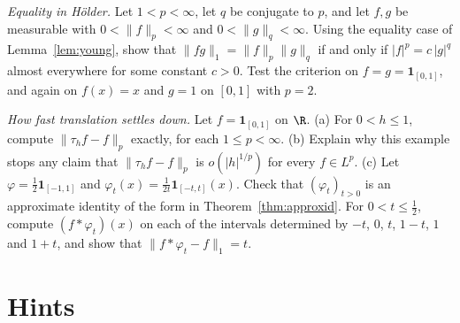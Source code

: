 \begin{exercise}[$\star\star$]\label{ex:v7c10c}
\emph{Equality in Hölder.} Let $1<p<\infty$, let $q$ be conjugate to $p$, and let $f,g$ be measurable with $0<\|f\|_p<\infty$ and $0<\|g\|_q<\infty$. Using the equality case of Lemma~\ref{lem:young}, show that $\|fg\|_1=\|f\|_p\|g\|_q$ if and only if $|f|^p=c\,|g|^q$ almost everywhere for some constant $c>0$. Test the criterion on $f=g=\mathbf 1_{[0,1]}$, and again on $f(x)=x$ and $g=1$ on $[0,1]$ with $p=2$.
\end{exercise}

\begin{exercise}[$\star\star\star$]\label{ex:v7c10d}
\emph{How fast translation settles down.} Let $f=\mathbf 1_{[0,1]}$ on $\R$. (a) For $0<h\le1$, compute $\|\tau_hf-f\|_p$ exactly, for each $1\le p<\infty$. (b) Explain why this example stops any claim that $\|\tau_hf-f\|_p$ is $o(|h|^{1/p})$ for every $f\in L^p$. (c) Let $\varphi=\frac12\mathbf 1_{[-1,1]}$ and $\varphi_t(x)=\frac1{2t}\mathbf 1_{[-t,t]}(x)$. Check that $(\varphi_t)_{t>0}$ is an approximate identity of the form in Theorem~\ref{thm:approxid}. For $0<t\le\frac12$, compute $(f*\varphi_t)(x)$ on each of the intervals determined by $-t$, $0$, $t$, $1-t$, $1$ and $1+t$, and show that $\|f*\varphi_t-f\|_1=t$.
\end{exercise}

\section{Hints}

